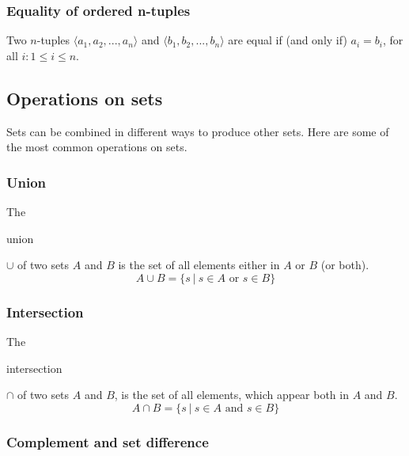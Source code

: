 \documentclass[11pt]{article}
\theoremstyle{plain}
\theoremstyle{definition}
\begin{document}
\subsubsection*{Equality of ordered n-tuples}

Two $ n $-tuples $ \langle a_1, a_2, ..., a_n \rangle $ and $ \langle b_1, b_2, ..., b_n \rangle $ are equal if (and only if) $ a_i = b_i $, for all $ i : 1 \le i \le n $.

\subsection*{Operations on sets}

Sets can be combined in different ways to produce other sets. Here are some of the most common operations on sets.

\subsubsection*{Union}

\begin{center}
  \def\svgwidth{0.3\columnwidth}
  
\end{center}

\noindent The \begin{em}union\end{em} $ \cup $ of two sets $ A $ and $ B $ is the set of all elements either in $ A $ or $ B $ (or both). 
$$ 
A \cup B = \{ s \ | \ s \in A \text{ or } s \in B \} 
$$

\subsubsection*{Intersection}

\begin{center}
  \def\svgwidth{0.3\columnwidth}
  
\end{center}

\noindent The \begin{em}intersection\end{em} $ \cap $ of two sets $ A $ and $ B $, is the set of all elements, which appear both in $ A $ and $ B $. 
$$
A \cap B = \{ s \ | \ s \in A \text{ and } s \in B \} 
$$

\subsubsection*{Complement and set difference}
\end{document}
